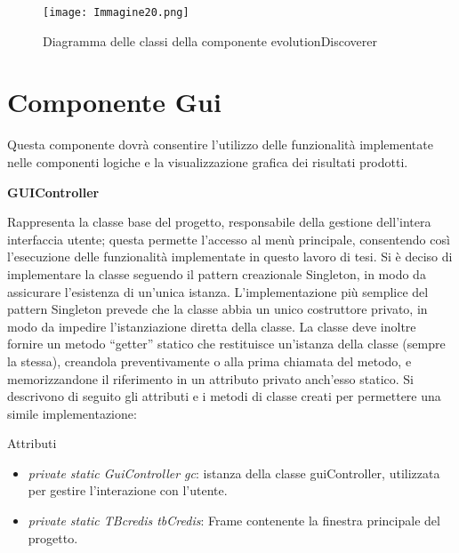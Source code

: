 \begin{figure}[H]
	\centering
	\texttt{[image: Immagine20.png]}
	\caption{Diagramma delle classi della componente evolutionDiscoverer}
	\label{AlberoDipendenze}
\end{figure}

\section{Componente Gui}
Questa componente dovrà consentire l'utilizzo delle funzionalità implementate nelle componenti logiche e la visualizzazione grafica dei risultati prodotti.

\textbf{GUIController}

Rappresenta la classe base del progetto, responsabile della gestione dell'intera interfaccia utente; questa permette l'accesso al menù principale, consentendo così l'esecuzione delle funzionalità implementate in questo lavoro di tesi.
Si è deciso di implementare la classe seguendo il pattern creazionale Singleton, in modo da assicurare l'esistenza di un'unica istanza. L'implementazione più semplice del pattern Singleton prevede che la classe abbia un unico costruttore privato, in modo da impedire l'istanziazione diretta della classe. La classe deve inoltre fornire un metodo ``getter'' statico che restituisce un'istanza della classe (sempre la stessa), creandola preventivamente o alla prima chiamata del metodo, e memorizzandone il riferimento in un attributo privato anch'esso statico.
Si descrivono di seguito gli attributi e i metodi di classe creati per permettere una simile implementazione:

Attributi
\begin{itemize}
	\item  \textit{private static GuiController gc}: istanza della classe guiController, utilizzata per gestire l'interazione con l'utente.
	\item  \textit{private static TBcredis tbCredis}: Frame contenente la finestra principale del progetto.	
\end{itemize}

